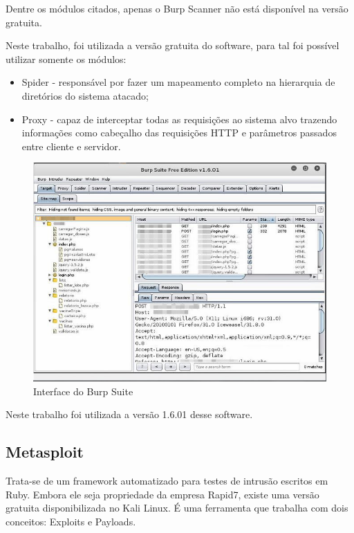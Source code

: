 \documentclass[
    12pt,               %
    openright,          %
    oneside,            %
    a4paper,            %
    section=TITLE,     %
    english,            %
    french,             %
    spanish,            %
    brazil              %
    ]{abntex2}
\newcommand{\citep}{\cite}
\begin{document}
Dentre os módulos citados, apenas o Burp Scanner não está disponível na versão gratuita.


Neste trabalho, foi utilizada a versão gratuita do software, para tal foi possível utilizar somente os módulos:



\begin{itemize}
	
\item Spider - responsável por fazer um mapeamento completo na hierarquia de diretórios do sistema atacado;
	
\item Proxy - capaz de interceptar todas as requisições ao sistema alvo trazendo informações como cabeçalho das requisições HTTP e parâmetros passados entre cliente e servidor.

\end{itemize}




\begin{figure}[htp]
\centering
\caption{Interface do Burp Suite}
\includegraphics[width=450px]{image2.jpeg}
\end{figure}
\ifdefined\FloatBarrier \FloatBarrier \fi


Neste trabalho foi utilizada a versão 1.6.01 desse software.



\subsection*{Metasploit}

Trata-se de um framework automatizado para testes de intrusão escritos em Ruby. Embora ele seja propriedade da empresa Rapid7\citep{62226}, existe uma versão gratuita disponibilizada no Kali Linux. É uma ferramenta que trabalha com dois conceitos: Exploits e Payloads.
\end{document}
